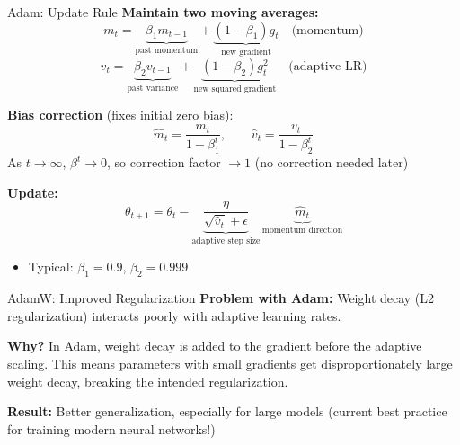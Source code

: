 \begin{frame}{Adam: Update Rule}
\textbf{Maintain two moving averages:}
\[
m_t = \underbrace{\beta_1 m_{t-1}}_{\text{past momentum}} + \underbrace{(1 - \beta_1) g_t}_{\text{new gradient}} \quad \text{(momentum)}
\]
\[
v_t = \underbrace{\beta_2 v_{t-1}}_{\text{past variance}} + \underbrace{(1 - \beta_2) g_t^2}_{\text{new squared gradient}} \quad \text{(adaptive LR)}
\]

\textbf{Bias correction} (fixes initial zero bias):
\[
\hat m_t = \frac{m_t}{1 - \beta_1^t}, \qquad \hat v_t = \frac{v_t}{1 - \beta_2^t}
\]
{\footnotesize As $t \to \infty$, $\beta^t \to 0$, so correction factor $\to 1$ (no correction needed later)}

\textbf{Update:}
\[
\theta_{t+1} = \theta_t - \underbrace{\frac{\eta}{\sqrt{\hat v_t} + \epsilon}}_{\text{adaptive step size}} \, \underbrace{\hat m_t}_{\text{momentum direction}}
\]
\begin{itemize}
\item Typical: $\beta_1 = 0.9$, $\beta_2 = 0.999$
\end{itemize}
\end{frame}
\begin{frame}{AdamW: Improved Regularization}
\textbf{Problem with Adam:} Weight decay (L2 regularization) interacts poorly with adaptive learning rates.

\textbf{Why?} In Adam, weight decay is added to the gradient before the adaptive scaling. This means parameters with small gradients get disproportionately large weight decay, breaking the intended regularization.

\vspace{0.5em}
\centering
{}

\vspace{0.8em}
\textbf{Result:} Better generalization, especially for large models (current best practice for training modern neural networks!)
\end{frame}

